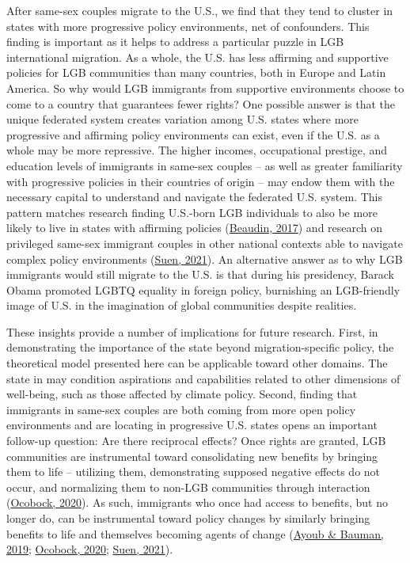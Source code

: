 \documentclass[
  12pt,
]{article}
\begin{document}
After same-sex couples migrate to the U.S., we find that they tend to cluster in states with more progressive policy environments, net of confounders. This finding is important as it helps to address a particular puzzle in LGB international migration. As a whole, the U.S. has less affirming and supportive policies for LGB communities than many countries, both in Europe and Latin America. So why would LGB immigrants from supportive environments choose to come to a country that guarantees fewer rights? One possible answer is that the unique federated system creates variation among U.S. states where more progressive and affirming policy environments can exist, even if the U.S. as a whole may be more repressive. The higher incomes, occupational prestige, and education levels of immigrants in same-sex couples -- as well as greater familiarity with progressive policies in their countries of origin -- may endow them with the necessary capital to understand and navigate the federated U.S. system. This pattern matches research finding U.S.-born LGB individuals to also be more likely to live in states with affirming policies (\protect\hyperlink{ref-beaudin_2017}{Beaudin, 2017}) and research on privileged same-sex immigrant couples in other national contexts able to navigate complex policy environments (\protect\hyperlink{ref-suen_2021_sexual}{Suen, 2021}). An alternative answer as to why LGB immigrants would still migrate to the U.S. is that during his presidency, Barack Obama promoted LGBTQ equality in foreign policy, burnishing an LGB-friendly image of U.S. in the imagination of global communities despite realities.

These insights provide a number of implications for future research. First, in demonstrating the importance of the state beyond migration-specific policy, the theoretical model presented here can be applicable toward other domains. The state in may condition aspirations and capabilities related to other dimensions of well-being, such as those affected by climate policy. Second, finding that immigrants in same-sex couples are both coming from more open policy environments and are locating in progressive U.S. states opens an important follow-up question: Are there reciprocal effects? Once rights are granted, LGB communities are instrumental toward consolidating new benefits by bringing them to life -- utilizing them, demonstrating supposed negative effects do not occur, and normalizing them to non-LGB communities through interaction (\protect\hyperlink{ref-ocobock_2020_leveraging}{Ocobock, 2020}). As such, immigrants who once had access to benefits, but no longer do, can be instrumental toward policy changes by similarly bringing benefits to life and themselves becoming agents of change (\protect\hyperlink{ref-ayoub_2019_migration}{Ayoub \& Bauman, 2019}; \protect\hyperlink{ref-ocobock_2020_leveraging}{Ocobock, 2020}; \protect\hyperlink{ref-suen_2021_sexual}{Suen, 2021}).
\end{document}
